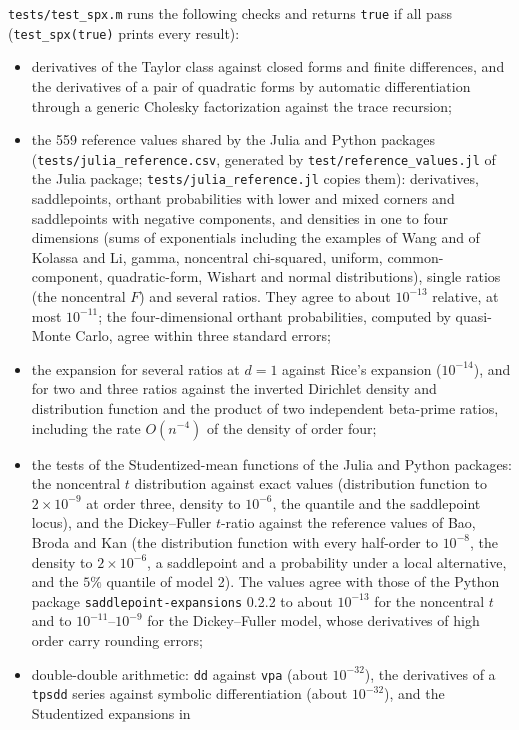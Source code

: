 \documentclass[11pt]{article}
\newcommand{\prog}[1]{\texttt{#1}}
\begin{document}
\prog{tests/test\_spx.m} runs the following checks and returns \prog{true} if all pass
(\prog{test\_spx(true)} prints every result):
\begin{itemize}
\item derivatives of the Taylor class against closed forms and finite differences, and the
derivatives of a pair of quadratic forms by automatic differentiation through a generic Cholesky
factorization against the trace recursion;
\item the 559 reference values shared by the Julia and Python packages
(\prog{tests/julia\_reference.csv}, generated by \prog{test/reference\_values.jl} of the Julia package;
\prog{tests/julia\_reference.jl} copies them): derivatives, saddlepoints, orthant probabilities with
lower and mixed corners and saddlepoints with negative components, and densities in one to four
dimensions (sums of exponentials including the examples of Wang and of Kolassa and Li, gamma,
noncentral chi-squared, uniform, common-component, quadratic-form, Wishart and normal
distributions), single ratios (the noncentral $F$) and several ratios. They agree to about
$10^{-13}$ relative, at most $10^{-11}$; the four-dimensional orthant probabilities, computed by
quasi-Monte Carlo, agree within three standard errors;
\item the expansion for several ratios at $d=1$ against Rice's expansion ($10^{-14}$), and for two and
three ratios against the inverted Dirichlet density and distribution function and the product of
two independent beta-prime ratios, including the rate $O(n^{-4})$ of the density of order four;
\item the tests of the Studentized-mean functions of the Julia and Python packages: the noncentral
$t$ distribution against exact values (distribution function to $2\times10^{-9}$ at order three,
density to $10^{-6}$, the quantile and the saddlepoint locus), and the Dickey--Fuller $t$-ratio
against the reference values of Bao, Broda and Kan (the distribution function with every half-order
to $10^{-8}$, the density to $2\times10^{-6}$, a saddlepoint and a probability under a local
alternative, and the $5\%$ quantile of model 2). The values agree with those of the Python package
\prog{saddlepoint-expansions} 0.2.2 to about $10^{-13}$ for the noncentral $t$ and to
$10^{-11}$--$10^{-9}$ for the Dickey--Fuller model, whose derivatives of high order carry rounding errors;
\item double-double arithmetic: \prog{dd} against \prog{vpa} (about $10^{-32}$), the derivatives of a
\prog{tpsdd} series against symbolic differentiation (about $10^{-32}$), and the Studentized expansions in

\end{itemize}
\end{document}
